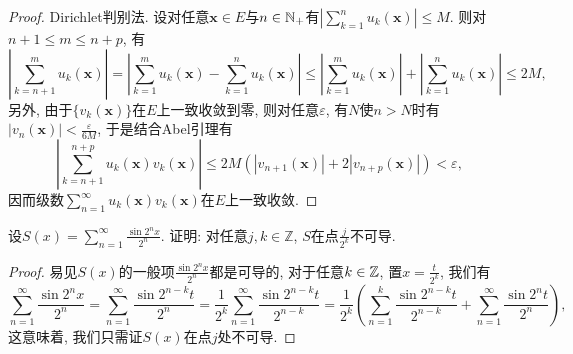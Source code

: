 \begin{quiza}
\begin{proof}
Dirichlet判别法. 设对任意\(\boldsymbol{x}\in E\)与\(n\in\mathbb{N}_+\)有\(\left|\sum_{k=1}^{n}u_k(\boldsymbol{x})\right|\leqslant M\). 则对\(n+1\leqslant m\leqslant n+p\), 有\[\left|\sum_{k=n+1}^{m}u_k(\boldsymbol{x})\right|=\left|\sum_{k=1}^{m}u_k(\boldsymbol{x})-\sum_{k=1}^{n}u_k(\boldsymbol{x})\right|\leqslant\left|\sum_{k=1}^{m}u_k(\boldsymbol{x})\right|+\left|\sum_{k=1}^{n}u_k(\boldsymbol{x})\right|\leqslant 2M,\]另外, 由于\(\{v_k(\boldsymbol{x})\}\)在\(E\)上一致收敛到零, 则对任意\(\varepsilon\), 有\(N\)使\(n>N\)时有\(|v_n(\boldsymbol{x})|<\frac{\varepsilon}{6M}\), 于是结合Abel引理有
\[\left|\sum_{k=n+1}^{n+p}u_k(\boldsymbol{x})v_k(\boldsymbol{x})\right|\leqslant 2M\left(|v_{n+1}(\boldsymbol{x})|+2|v_{n+p}(\boldsymbol{x})|\right)<\varepsilon,\]因而级数\(\sum_{n=1}^{\infty}u_k(\boldsymbol{x})v_k(\boldsymbol{x})\)在\(E\)上一致收敛.
\end{proof}
\woe 设\(S(x)=\sum_{n=1}^{\infty}\frac{\sin 2^nx}{2^n}\). 证明: 对任意\(j,k\in\mathbb{Z}\), \(S\)在点\(\frac{j}{2^k}\)不可导.
\begin{proof}
易见\(S(x)\)的一般项\(\frac{\sin 2^nx}{2^n}\)都是可导的, 对于任意\(k\in\mathbb{Z}\), 置\(x=\frac{t}{2^k}\), 我们有\[\sum_{n=1}^{\infty}\frac{\sin 2^nx}{2^n}=\sum_{n=1}^{\infty}\frac{\sin 2^{n-k}t}{2^n}=\frac{1}{2^k}\sum_{n=1}^{\infty}\frac{\sin 2^{n-k}t}{2^{n-k}}=\frac{1}{2^{k}}\left(\sum_{n=1}^{k}\frac{\sin 2^{n-k}t}{2^{n-k}}+\sum_{n=1}^{\infty}\frac{\sin 2^nt}{2^n}\right),\]这意味着, 我们只需证\(S(x)\)在点\(j\)处不可导.


\end{proof}
\end{quiza}
